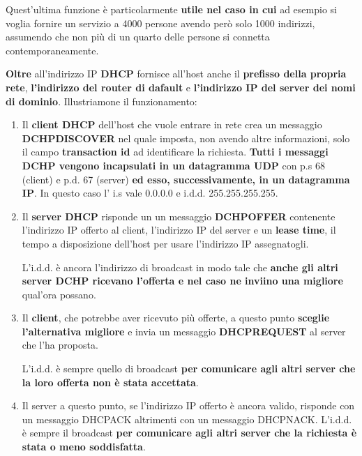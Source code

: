 \documentclass[11pt,a4paper,oneside]{book}
\theoremstyle{definition}
\begin{document}
Quest'ultima funzione è particolarmente \textbf{utile nel caso in cui} ad esempio si voglia fornire un servizio a 4000 persone avendo però solo 1000 indirizzi, assumendo che non più di un quarto delle persone si connetta contemporaneamente.

\textbf{Oltre} all'indirizzo IP \textbf{DHCP} fornisce all'host anche il \textbf{prefisso della propria rete}, \textbf{l'indirizzo del router di dafault} e \textbf{l'indirizzo IP del server dei nomi di dominio}. Illustriamone il funzionamento:

\begin{enumerate}
	\item Il \textbf{client DHCP} dell'host che vuole entrare in rete crea un messaggio \textbf{DCHPDISCOVER} nel quale imposta, non avendo altre informazioni, solo il campo \textbf{transaction id} ad identificare la richiesta.
	      \textbf{Tutti i messaggi DCHP vengono incapsulati in un datagramma UDP} con p.s 68 (client) e p.d. 67 (server) \textbf{ed esso, successivamente, in un datagramma IP}. In questo caso l' i.s vale 0.0.0.0 e i.d.d. 255.255.255.255.


	\item Il \textbf{server DHCP} risponde un un messaggio \textbf{DCHPOFFER} contenente l'indirizzo IP offerto al client, l'indirizzo IP del server e un \textbf{lease time}, il tempo a disposizione dell'host per usare l'indirizzo IP assegnatogli.

	      \pagebreak

	      L'i.d.d. è ancora l'indirizzo di broadcast in modo tale che \textbf{anche gli altri server DCHP ricevano l'offerta e nel caso ne inviino una migliore} qual'ora possano.

	\item Il \textbf{client}, che potrebbe aver ricevuto più offerte, a questo punto \textbf{sceglie l'alternativa migliore} e invia un messaggio \textbf{DHCPREQUEST} al server che l'ha proposta.

	      L'i.d.d. è sempre quello di broadcast \textbf{per comunicare agli altri server che la loro offerta non è stata accettata}.

	\item Il server a questo punto, se l'indirizzo IP offerto è ancora valido, risponde con un messaggio DHCPACK altrimenti con un messaggio DHCPNACK. L'i.d.d. è sempre il broadcast \textbf{per comunicare agli altri server che la richiesta è stata o meno soddisfatta}.
\end{enumerate}
\end{document}
